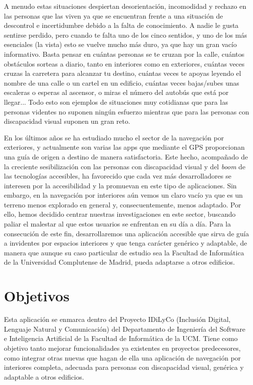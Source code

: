 A menudo estas situaciones despiertan desorientación, incomodidad y rechazo en las personas que las viven ya que se encuentran frente a una situación de descontrol e incertidumbre debido a la falta de conocimiento. A nadie le gusta sentirse perdido, pero cuando te falta uno de los cinco sentidos, y uno de los más esenciales (la vista) esto se vuelve mucho más duro, ya que hay un gran vacío informativo. Basta pensar en cuántas personas se te cruzan por la calle, cuántos obstáculos sorteas a diario, tanto en interiores como en exteriores, cuántas veces cruzas la carretera para alcanzar tu destino, cuántas veces te apoyas leyendo el nombre de una calle o un cartel en un edificio, cuántas veces bajas/subes unas escaleras o esperas al ascensor, o miras el número del autobús que está por llegar... Todo esto son ejemplos de situaciones muy cotidianas que para las personas videntes no suponen ningún esfuerzo mientras que para las personas con discapacidad visual suponen un gran reto. 

En los últimos años se ha estudiado mucho el sector de la navegación por exteriores, y actualmente son varias las apps que mediante el GPS proporcionan una guía de origen a destino de manera satisfactoria. Este hecho, acompañado de la creciente sesibilización con las personas con discapacidad visual y del \textit{boom} de las tecnologías accesibles, ha favorecido que cada vez más desarrolladores se interesen por la accesibilidad y la promuevan en este tipo de aplicaciones. Sin embargo, en la navegación por interiores aún vemos un claro vacío ya que es un terreno menos explorado en general y, consecuentemente, menos adaptado. Por ello, hemos decidido centrar nuestras investigaciones en este sector, buscando paliar el malestar al que estos usuarios se enfrentan en su día a día. Para la consecución de este fin, desarrollaremos una aplicación accesible que sirva de guía a invidentes por espacios interiores y que tenga carácter genérico y adaptable, de manera que aunque su caso particular de estudio sea la Facultad de Informática de la Universidad Complutense de Madrid, pueda adaptarse a otros edificios. 


\section{Objetivos}
\label{sec:objetivosProyecto}

Esta aplicación se enmarca dentro del Proyecto IDiLyCo (Inclusión Digital, Lenguaje Natural y Comunicación) del Departamento de
Ingeniería del Software e Inteligencia Artificial de la Facultad de Informática de la UCM. Tiene
como objetivo tanto mejorar funcionalidades ya existentes en proyectos predecesores, como integrar otras nuevas que hagan de ella una aplicación de navegación por interiores completa, adecuada para personas con discapacidad visual, genérica y adaptable a otros edificios.

